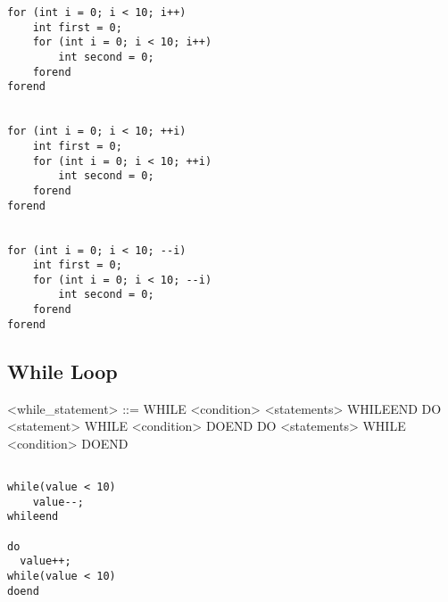 \documentclass{article}
\begin{document}
\begin{lstlisting}[style=CStyle]
for (int i = 0; i < 10; i++)
    int first = 0;
    for (int i = 0; i < 10; i++)
        int second = 0;
    forend
forend


for (int i = 0; i < 10; ++i)
    int first = 0;
    for (int i = 0; i < 10; ++i)
        int second = 0;
    forend
forend


for (int i = 0; i < 10; --i)
    int first = 0;
    for (int i = 0; i < 10; --i)
        int second = 0;
    forend
forend
\end{lstlisting}

\subsection{While Loop}

\begin{grammar}
<while\_statement> ::= WHILE <condition> <statements> WHILEEND
\alt DO <statement> WHILE <condition> DOEND
\alt DO <statements> WHILE <condition> DOEND
\end{grammar}

\begin{lstlisting}[style=CStyle]

while(value < 10)
    value--;
whileend

do
  value++;
while(value < 10)
doend
\end{lstlisting}
\end{document}

